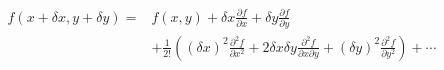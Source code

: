 \[
\begin{aligned}
f(x + \delta x, y + \delta y) = {} & f(x, y) + \delta x \frac{\partial f}{\partial x} + \delta y \frac{\partial f}{\partial y} \\
& + \frac{1}{2!} \left( (\delta x)^2 \frac{\partial^2 f}{\partial x^2} + 2 \delta x \delta y \frac{\partial^2 f}{\partial x \partial y} + (\delta y)^2 \frac{\partial^2 f}{\partial y^2} \right) + \cdots
\end{aligned}
\]
